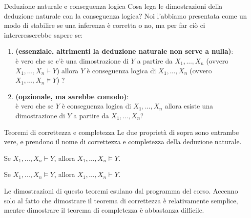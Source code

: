 \documentclass[aspectratio=169,10pt,dvipsnames,xcolor=table,handout]{beamer}
\begin{document}
\begin{frame}{Deduzione naturale e conseguenza logica}
    Cosa lega le dimostrazioni della deduzione naturale con la conseguenza logica? Noi l'abbiamo presentata come un modo di stabilire se una inferenza è corretta o no, ma per far ciò ci intereresserebbe sapere se:
    \begin{enumerate}
        \item \textbf{(essenziale, altrimenti la deduzione naturale non serve a nulla)}:\\
        è vero che se c'è una dimostrazione di $Y$ a partire da $X_1, \ldots, X_n$ (ovvero $X_1, \ldots, X_n \vdash Y$) allora $Y$ è conseguenza logica di $X_1, \ldots, X_n$ (ovvero $X_1, \ldots, X_n \models Y$) ?
        \item \textbf{(opzionale, ma sarebbe comodo)}:\\
        è vero che se $Y$ è conseguenza logica di $X_1, \ldots, X_n$ allora esiste una dimostrazione di $Y$ a partire da $X_1, \ldots, X_n$?
    \end{enumerate}
\end{frame}

\begin{frame}{Teoremi di correttezza e completezza}
    Le due proprietà di sopra sono entrambe vere, e prendono il nome di \alert{correttezza} e \alert{completezza} della deduzione naturale.

    \begin{theorem}
        Se $X_1, \ldots, X_n \vdash Y$, allora $X_1, \ldots, X_n \models Y$.
    \end{theorem}

    \begin{theorem}
        Se $X_1, \ldots, X_n \models Y$, allora $X_1, \ldots, X_n \vdash Y$.
    \end{theorem}

    \medskip
    Le dimostrazioni di questo teoremi esulano dal programma del corso. Accenno solo al fatto che dimostrare il teorema di correttezza è relativamente semplice, mentre dimostrare il teorema di completezza è abbastanza difficile.
\end{frame}
\end{document}
